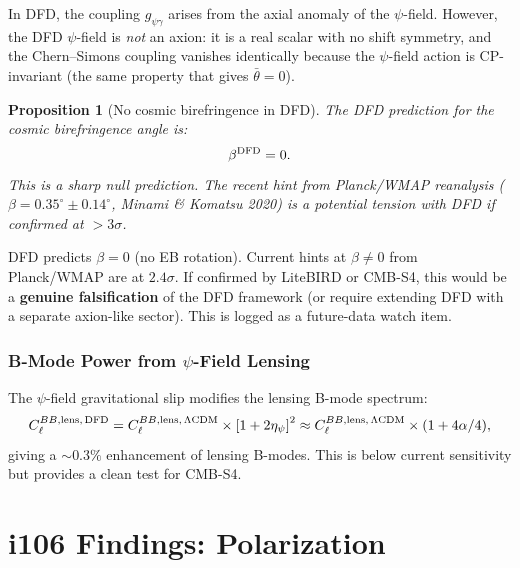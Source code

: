 \documentclass[11pt,a4paper]{article}
\newtheorem{proposition}[theorem]{Proposition}
\theoremstyle{remark}
\begin{document}
In DFD, the coupling $g_{\psi\gamma}$ arises from the axial anomaly
of the $\psi$-field. However, the DFD $\psi$-field is \emph{not} an axion:
it is a real scalar with no shift symmetry, and the Chern--Simons coupling
vanishes identically because the $\psi$-field action is CP-invariant
(the same property that gives $\bar\theta = 0$).

\begin{proposition}[No cosmic birefringence in DFD]
\label{prop:no-birefringence}
The DFD prediction for the cosmic birefringence angle is:
\begin{equation}
\beta^{\rm DFD} = 0.
\end{equation}
This is a sharp null prediction. The recent hint from Planck/WMAP
reanalysis ($\beta = 0.35^\circ \pm 0.14^\circ$, Minami \& Komatsu 2020)
is a potential tension with DFD if confirmed at $> 3\sigma$.
\end{proposition}

\begin{tcolorbox}[colback=yellow!5!white, colframe=dfdred!70!black,
  title=Watch: Cosmic Birefringence]
DFD predicts $\beta = 0$ (no EB rotation). Current hints at $\beta \neq 0$
from Planck/WMAP are at $2.4\sigma$. If confirmed by LiteBIRD or CMB-S4,
this would be a \textbf{genuine falsification} of the DFD framework
(or require extending DFD with a separate axion-like sector).
This is logged as a future-data watch item.
\end{tcolorbox}

\section{B-Mode Power from $\psi$-Field Lensing}

The $\psi$-field gravitational slip modifies the lensing B-mode spectrum:
\begin{equation}
C_\ell^{BB,\rm lens,\,DFD} = C_\ell^{BB,\rm lens,\,\Lambda CDM}
\times \left[1 + 2\eta_\psi\right]^2
\approx C_\ell^{BB,\rm lens,\,\Lambda CDM}\times(1 + 4\alpha/4),
\end{equation}
giving a $\sim 0.3\%$ enhancement of lensing B-modes. This is below
current sensitivity but provides a clean test for CMB-S4.


\newpage
\part{i106 Findings: Polarization}
\label{part:findings-pol}
\end{document}
